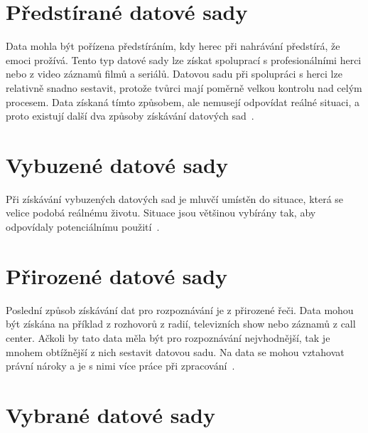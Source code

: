 \documentclass[FM,BP]{tulthesis}
\begin{document}
\section{Předstírané datové sady} %
Data mohla být pořízena předstíráním, kdy herec při nahrávání předstírá, že emoci prožívá. Tento typ datové sady lze získat spoluprací s profesionálními herci nebo z video záznamů filmů a seriálů. Datovou sadu při spolupráci s herci lze relativně snadno sestavit, protože tvůrci mají poměrně velkou kontrolu nad celým procesem. Data získaná tímto způsobem, ale nemusejí odpovídat reálné situaci, a proto existují další dva způsoby získávání datových sad~\cite{konar_chakraborty_2015}.

\section{Vybuzené datové sady} %
Při získávání vybuzených datových sad je mluvčí umístěn do situace, která se velice podobá reálnému životu. Situace jsou většinou vybírány tak, aby odpovídaly potenciálnímu použití~\cite{konar_chakraborty_2015}.

\section{Přirozené datové sady} %
Poslední způsob získávání dat pro rozpoznávání je z přirozené řeči. Data mohou být získána na příklad z rozhovorů z radií, televizních show nebo záznamů z call center. Ačkoli by tato data měla být pro rozpoznávání nejvhodnější, tak je mnohem obtížnější z nich sestavit datovou sadu. Na data se mohou vztahovat právní nároky a je s nimi více práce při zpracování~\cite{DBLP:journals/speech/AkcayO20}.

\section{Vybrané datové sady}
\end{document}
